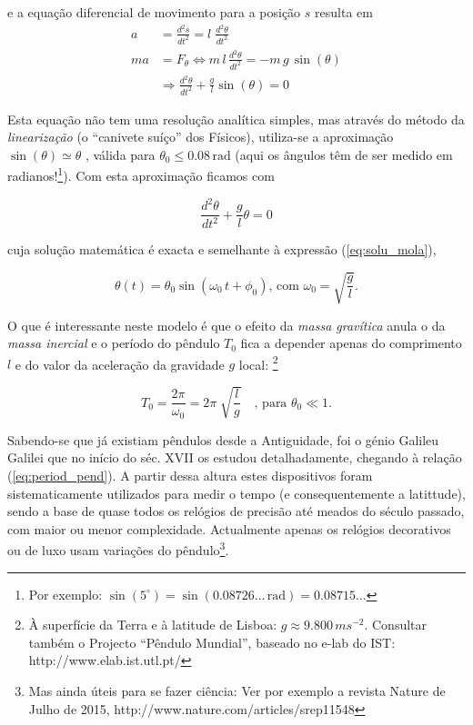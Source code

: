 \documentclass[a4paper,twoside,12pt]{article}      %
\begin{document}
e a equação diferencial de movimento para a posição $s$ resulta em
\begin{align}
	\label{eq:5} 
	a &= \frac{d^2 s}{dt^2} =  l\;  \frac{d^2 \theta}{dt^2} \nonumber \\
	ma &= F_{\theta}\Leftrightarrow m \, l \, \frac{d^2 \theta}{dt^2} = - m \,  g \, \sin(\theta) \nonumber \\
	 & \Rightarrow \frac{d^2 \theta}{dt^2} + \frac{g}{l} \sin(\theta) = 0
\end{align}

Esta equação não tem uma resolução analítica simples, mas através do método  da \emph{linearização} (o ``canivete suíço'' dos Físicos),  utiliza-se a aproximação $ \sin(\theta) \simeq \theta$ , válida para  $\theta_0 \le 0.08\,\mathrm{rad}$ (aqui  os ângulos têm de ser medido em radianos!\footnote{ Por exemplo: $\sin(5 ^{\circ}) = \sin(0.08726... \, \mathrm{rad}) = 0.08715... $}).
Com esta aproximação ficamos com 

\begin{equation}
	\label{eq:6} 
	 \frac{d^2 \theta}{dt^2} + \frac{g}{l} \theta =0
\end{equation}

cuja solução matemática é exacta e semelhante à expressão (\ref{eq:solu_mola}),

\begin{equation}
	\label{eq:solu_pend}
\theta (t) = \theta_0 \sin(\omega_0 \, t + \phi_0) \text{, com } \omega_0 = \sqrt{\frac{g}{l}}.
\end{equation}

O que é interessante neste modelo é que o efeito da \emph{massa gravítica } anula o da \emph{massa inercial } e o período do pêndulo $T_0$ fica a  depender apenas do comprimento $l$  e do valor da aceleração da gravidade $g$  local:
\footnote{À superfície da Terra e à latitude de Lisboa: $g\approx 9.800\,m s^{-2}$. Consultar também o Projecto ``Pêndulo Mundial'', baseado no e-lab do IST: http://www.elab.ist.utl.pt/}

\begin{equation}
	\label{eq:period_pend}
T_0 = \frac{2 \pi}{\omega_0} = 2\pi\; \sqrt{\frac{l}{g}} \quad  \text{, para }	\theta_0 \ll 1.
\end{equation}

Sabendo-se que já existiam pêndulos  desde a Antiguidade, foi o génio  Galileu Galilei que no início do séc. XVII os estudou detalhadamente, chegando à relação (\ref{eq:period_pend}).
A partir dessa altura
estes dispositivos foram sistematicamente utilizados para medir o tempo (e consequentemente a latittude), sendo a base 
de quase todos os relógios de precisão até meados do século passado, com maior ou menor complexidade.
Actualmente apenas os relógios decorativos ou de luxo usam variações do pêndulo\footnote{Mas ainda úteis para se fazer ciência: Ver por exemplo a revista Nature de Julho de 2015, http://www.nature.com/articles/srep11548}.
\end{document}
